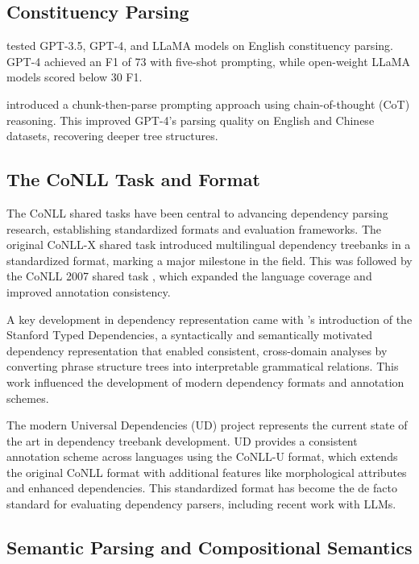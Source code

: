 \subsection{Constituency Parsing}

\citet{bai2023llmconst} tested GPT-3.5, GPT-4, and LLaMA models on English constituency parsing. GPT-4 achieved an F1 of 73 with five-shot prompting, while open-weight LLaMA models scored below 30 F1.

\citet{tian2024chunkprompt} introduced a chunk-then-parse prompting approach using chain-of-thought (CoT) reasoning. This improved GPT-4's parsing quality on English and Chinese datasets, recovering deeper tree structures.

\subsection{The CoNLL Task and Format}

The CoNLL shared tasks have been central to advancing dependency parsing research, establishing standardized formats and evaluation frameworks. The original CoNLL-X shared task \citep{buchholz2006conll} introduced multilingual dependency treebanks in a standardized format, marking a major milestone in the field. This was followed by the CoNLL 2007 shared task \citep{nivre2007conll}, which expanded the language coverage and improved annotation consistency.

A key development in dependency representation came with \citet{de2006generating}'s introduction of the Stanford Typed Dependencies, a syntactically and semantically motivated dependency representation that enabled consistent, cross-domain analyses by converting phrase structure trees into interpretable grammatical relations. This work influenced the development of modern dependency formats and annotation schemes.

The modern Universal Dependencies (UD) project \citep{nivre2016universal} represents the current state of the art in dependency treebank development. UD provides a consistent annotation scheme across languages using the CoNLL-U format, which extends the original CoNLL format with additional features like morphological attributes and enhanced dependencies. This standardized format has become the de facto standard for evaluating dependency parsers, including recent work with LLMs.

\subsection{Semantic Parsing and Compositional Semantics}

